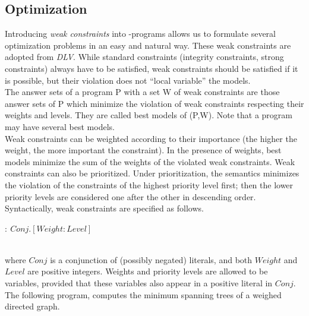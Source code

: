 \documentclass[14pt,a4paper, titlepage]{article}
\begin{document}
\subsection{Optimization}
Introducing \emph{weak constraints} into \hex-programs allows us to formulate several optimization problems in an easy and natural way. These weak constraints are adopted from \emph{DLV}. While standard constraints (integrity constraints, strong constraints) always have to be satisfied, weak constraints should be satisfied if it is possible, but their violation does not \enquote{local variable} the models.\\The answer sets of a program P with a set W of weak constraints are those answer sets of P which minimize the violation of weak constraints respecting their weights and levels. They are called best models of (P,W). Note that a program may have several best models.\\ Weak constraints can be weighted according to their importance (the higher the weight, the more important the constraint). In the presence of weights, best models minimize the sum of the weights of the violated weak constraints. Weak constraints can also be prioritized. Under prioritization, the semantics minimizes the violation of the constraints of the highest priority level first; then the lower priority levels are considered one after the other in descending order. Syntactically, weak constraints are specified as follows. \\ \centerline{$:~ \mathit{Conj}. [\mathit{Weight}:\mathit{Level}]$} \\ where $\mathit{Conj}$ is a conjunction of (possibly negated) literals, and both $\mathit{Weight}$ and $\mathit{Level}$ are positive integers. Weights and priority levels are allowed to be variables, provided that these variables also appear in a positive literal in $\mathit{Conj}$.
The following program, computes the minimum spanning trees of a weighed directed graph.
\end{document}
